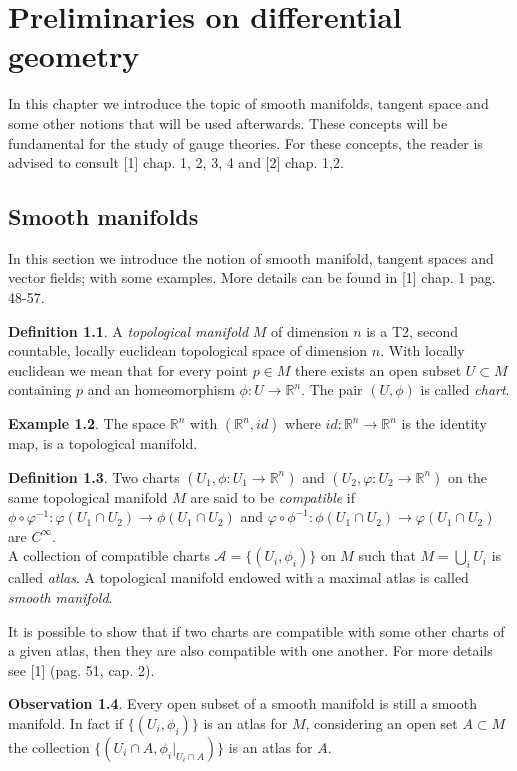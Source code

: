 \documentclass[12pt,a4paper]{report}
\theoremstyle{definition}
\newtheorem{Def}{Definition}[chapter]
\theoremstyle{Theorem}
\theoremstyle{definition}
\newtheorem{Ex}[Def]{Example}
\theoremstyle{definition}
\newtheorem{Obs}[Def]{Observation}
\begin{document}
	\chapter{Preliminaries on differential geometry}
	In this chapter we introduce the topic of smooth manifolds, tangent space and some other notions that will be used afterwards. These concepts will be fundamental for the study of gauge theories. For these concepts, the reader is advised to consult [1] chap. 1, 2, 3, 4 and [2] chap. 1,2.
	\section{Smooth manifolds}
	In this section we introduce the notion of smooth manifold, tangent spaces and vector fields; with some examples. More details can be found in [1] chap. 1 pag. 48-57.
	\begin{Def}
		A \textit{topological manifold} $M$ of dimension $n$ is a T2, second countable, locally euclidean topological space of dimension $n$. With locally euclidean we mean that for every point $p\in M$ there exists an open subset $U\subset M$ containing $p$ and an homeomorphism $\phi:U\rightarrow\mathbb{R}^n$. The pair $(U,\phi)$ is called \textit{chart}. 
	\end{Def}
	\begin{Ex}
		The space $\mathbb{R}^n$ with $(\mathbb{R}^n, id)$ where $id:\mathbb{R}^n\rightarrow \mathbb{R}^n$ is the identity map, is a topological manifold. 
	\end{Ex}
	\begin{Def}
		Two charts $(U_1,\phi:U_1\rightarrow\mathbb{R}^n)$ and $(U_2,\varphi:U_2\rightarrow\mathbb{R}^n)$ on the same topological manifold $M$ are said to be \textit{compatible} if
		$\phi\circ\varphi^{-1}:\varphi(U_1\cap U_2)\rightarrow \phi(U_1\cap U_2)$ and $\varphi\circ\phi^{-1}:\phi(U_1\cap U_2)\rightarrow \varphi(U_1\cap U_2)$ are $C^\infty$.\\
		A collection of compatible charts $\mathcal{A}=\{(U_i,\phi_{i})\}$ on $M$ such that $M=\bigcup_i U_i$ is called \textit{atlas}. A topological manifold endowed with a maximal atlas is called \textit{smooth manifold}.
	\end{Def}
	It is possible to show that if two charts are compatible with some other charts of a given atlas, then they are also compatible with one another. For more details see [1] (pag. 51, cap. 2).
	\begin{Obs}\label{Obs:1.1.1}
		Every open subset of a smooth manifold is still a smooth manifold. In fact if $\{(U_i,\phi_i)\}$ is an atlas for $M$, considering an open set $A\subset M$ the collection $\{(U_i\cap A,\phi_i|_{U_i\cap A})\}$ is an atlas for $A$.
	\end{Obs}
\end{document}
